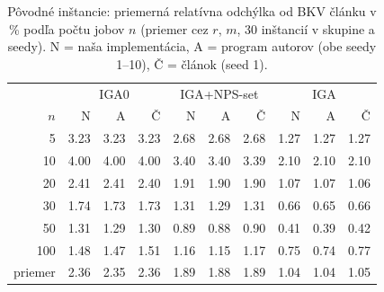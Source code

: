 \begin{table}[ht]
\centering
\small
\caption{Pôvodné inštancie: priemerná relatívna odchýlka od BKV článku v \% podľa počtu jobov $n$ (priemer cez $r$, $m$, 30 inštancií v skupine a seedy). N = naša implementácia, A = program autorov (obe seedy 1--10), Č = článok (seed 1).}
\label{tab:orig_rpd_by_n}
\begin{tabular}{r|rrr|rrr|rrr}
\toprule
 & \multicolumn{3}{c}{IGA0} & \multicolumn{3}{c}{IGA+NPS-set} & \multicolumn{3}{c}{IGA} \\
$n$ & N & A & Č & N & A & Č & N & A & Č \\
\midrule
5 & 3.23 & 3.23 & 3.23 & 2.68 & 2.68 & 2.68 & 1.27 & 1.27 & 1.27 \\
10 & 4.00 & 4.00 & 4.00 & 3.40 & 3.40 & 3.39 & 2.10 & 2.10 & 2.10 \\
20 & 2.41 & 2.41 & 2.40 & 1.91 & 1.90 & 1.90 & 1.07 & 1.07 & 1.06 \\
30 & 1.74 & 1.73 & 1.73 & 1.31 & 1.29 & 1.31 & 0.66 & 0.65 & 0.66 \\
50 & 1.31 & 1.29 & 1.30 & 0.89 & 0.88 & 0.90 & 0.41 & 0.39 & 0.42 \\
100 & 1.48 & 1.47 & 1.51 & 1.16 & 1.15 & 1.17 & 0.75 & 0.74 & 0.77 \\
\midrule
priemer & 2.36 & 2.35 & 2.36 & 1.89 & 1.88 & 1.89 & 1.04 & 1.04 & 1.05 \\
\bottomrule
\end{tabular}
\end{table}
